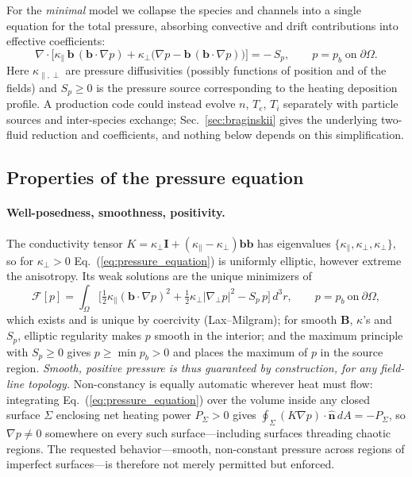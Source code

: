 \documentclass[english]{article}
\newcommand{\bB}{\mathbf{B}}
\newcommand{\bb}{\mathbf{b}}
\newcommand{\bn}{\mathbf{n}}
\newcommand{\bI}{\mathbf{I}}
\newcommand{\gradperp}{\nabla_{\!\perp}}
\begin{document}
For the \emph{minimal} model we collapse the species and channels into a single equation for the
total pressure, absorbing convective and drift contributions into effective coefficients:
\begin{equation}
\boxed{\;
\nabla\cdot\Big[\kappa_\parallel\,\bb\,(\bb\cdot\nabla p)
+\kappa_\perp\big(\nabla p-\bb\,(\bb\cdot\nabla p)\big)\Big]=-\,S_p ,
\qquad p=p_b\;\text{on}\;\partial\Omega .
\;}
\label{eq:pressure_equation}
\end{equation}
Here $\kappa_{\parallel,\perp}$ are pressure diffusivities (possibly functions of position and of
the fields) and $S_p\ge0$ is the pressure source corresponding to the heating deposition profile.
A production code could instead evolve $n$, $T_e$, $T_i$ separately with particle sources and
inter-species exchange; Sec.~\ref{sec:braginskii} gives the underlying two-fluid reduction and
coefficients, and nothing below depends on this simplification.

\subsection{Properties of the pressure equation}
\label{sec:p_properties}

\paragraph{Well-posedness, smoothness, positivity.}
The conductivity tensor
$K=\kappa_\perp\bI+(\kappa_\parallel-\kappa_\perp)\bb\bb$ has eigenvalues
$\{\kappa_\parallel,\kappa_\perp,\kappa_\perp\}$, so for $\kappa_\perp>0$
Eq.~(\ref{eq:pressure_equation}) is uniformly elliptic, however extreme the anisotropy. Its weak
solutions are the unique minimizers of
\begin{equation}
\mathcal{F}[p]=\int_\Omega\Big[\tfrac12\kappa_\parallel(\bb\cdot\nabla p)^{2}
+\tfrac12\kappa_\perp\big|\gradperp p\big|^{2}-S_p\,p\Big]\,d^3r ,
\qquad p=p_b\ \text{on}\ \partial\Omega ,
\label{eq:variational}
\end{equation}
which exists and is unique by coercivity (Lax--Milgram); for smooth $\bB$, $\kappa$'s and $S_p$,
elliptic regularity makes $p$ smooth in the interior; and the maximum principle with $S_p\ge0$
gives $p\ge\min p_b>0$ and places the maximum of $p$ in the source region. \emph{Smooth,
positive pressure is thus guaranteed by construction, for any field-line topology.} Non-constancy
is equally automatic wherever heat must flow: integrating Eq.~(\ref{eq:pressure_equation}) over the
volume inside any closed surface $\Sigma$ enclosing net heating power $P_\Sigma>0$ gives
$\oint_\Sigma(K\nabla p)\cdot\hat{\bn}\,dA=-P_\Sigma$, so $\nabla p\ne0$ somewhere on every such
surface---including surfaces threading chaotic regions. The requested behavior---smooth,
non-constant pressure across regions of imperfect surfaces---is therefore not merely permitted but
enforced.
\end{document}
